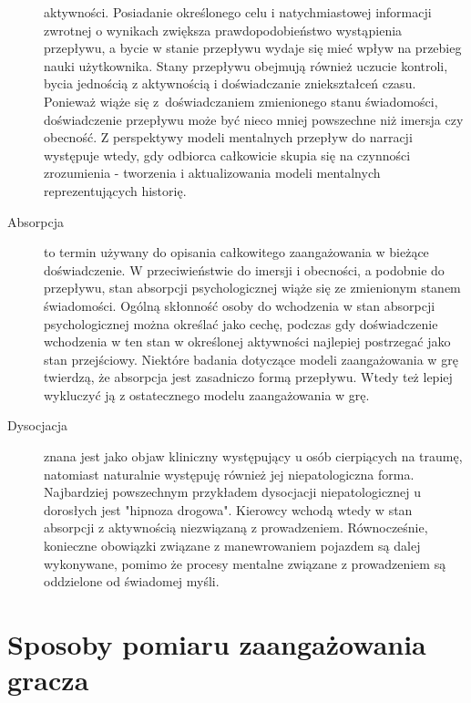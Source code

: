 \begin{description}
            aktywności\cite{development_of_game}. Posiadanie określonego celu i natychmiastowej informacji zwrotnej o wynikach zwiększa
            prawdopodobieństwo wystąpienia przepływu, a bycie w stanie przepływu wydaje się mieć wpływ na przebieg nauki
            użytkownika. Stany przepływu obejmują również uczucie kontroli, bycia jednością z aktywnością i doświadczanie
            zniekształceń czasu. Ponieważ wiąże się z~doświadczaniem zmienionego stanu świadomości, doświadczenie
            przepływu może być nieco mniej powszechne niż imersja czy obecność\cite{development_of_game}. Z perspektywy modeli mentalnych
            przepływ do narracji występuje wtedy, gdy odbiorca całkowicie skupia się na czynności zrozumienia -
            tworzenia i aktualizowania modeli mentalnych reprezentujących historię\cite{measuring_narrative}.
      \item[Absorpcja] to termin używany do opisania całkowitego zaangażowania w bieżące doświadczenie. W
            przeciwieństwie do imersji i obecności, a podobnie do przepływu, stan absorpcji psychologicznej
            wiąże się ze zmienionym stanem świadomości\cite{development_of_game}. Ogólną skłonność osoby do wchodzenia
            w stan absorpcji psychologicznej można określać jako cechę, podczas gdy doświadczenie
            wchodzenia w ten stan w określonej aktywności najlepiej postrzegać jako stan przejściowy\cite{development_of_game}.
            Niektóre badania dotyczące modeli zaangażowania w grę twierdzą, że absorpcja jest zasadniczo formą
            przepływu. Wtedy też lepiej wykluczyć ją z ostatecznego modelu zaangażowania w grę\cite{eng_in_games}.
      \item[Dysocjacja] znana jest jako objaw kliniczny występujący u osób cierpiących na traumę, natomiast
            naturalnie występuję również jej niepatologiczna forma\cite{development_of_game}.
            Najbardziej powszechnym przykładem dysocjacji niepatologicznej u dorosłych jest "hipnoza drogowa".
            Kierowcy wchodą wtedy w stan absorpcji z aktywnością niezwiązaną z prowadzeniem.
            Równocześnie, konieczne obowiązki związane z manewrowaniem
            pojazdem są dalej wykonywane, pomimo że procesy mentalne związane z prowadzeniem są oddzielone
            od świadomej myśli\cite{development_of_game}.
\end{description}

\section{Sposoby pomiaru zaangażowania gracza}\label{section:ch5_2}


